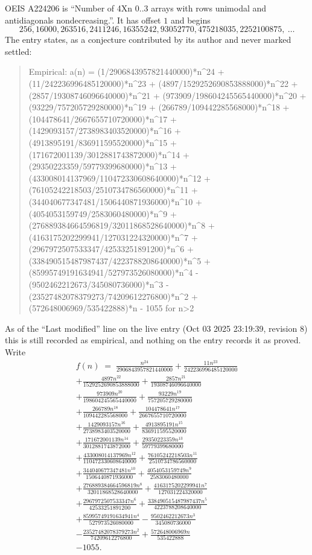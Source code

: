 \documentclass[11pt,a4paper]{article}
\theoremstyle{plain}
\theoremstyle{definition}
\begin{document}
OEIS A224206 is ``Number of 4Xn 0..3 arrays with rows unimodal and antidiagonals nondecreasing.''. It has offset $1$ and begins
\[
256, 16000, 263516, 2411246, 16355242, 93052770, 475218035, 2252100875,\ \dots
\]
The entry states, as a conjecture contributed by its author and never marked settled:
\begin{quote}\raggedright\small
Empirical: a(n) = (1/2906843957821440000)*n\^{}24 + (11/242236996485120000)*n\^{}23 + (4897/1529252690853888000)*n\^{}22 + (2857/19308746096640000)*n\^{}21 + (973909/198604245565440000)*n\^{}20 + (93229/757205729280000)*n\^{}19 + (266789/109442285568000)*n\^{}18 + (104478641/2667655710720000)*n\^{}17 + (1429093157/2738983403520000)*n\^{}16 + (4913895191/836911595520000)*n\^{}15 + (171672001139/3012881743872000)*n\^{}14 + (29350223359/59779399680000)*n\^{}13 + (433008014137969/110472330608640000)*n\^{}12 + (76105242218503/2510734786560000)*n\^{}11 + (344040677347481/1506440871936000)*n\^{}10 + (4054053159749/2583060480000)*n\^{}9 + (276889384664596819/32011868528640000)*n\^{}8 + (4163175202299941/127031224320000)*n\^{}7 + (2967972507533347/42533251891200)*n\^{}6 + (338490515487987437/4223788208640000)*n\^{}5 + (85995749191634941/527973526080000)*n\^{}4 - (9502462212673/345080736000)*n\^{}3 - (23527482078379273/74209612276800)*n\^{}2 + (572648006969/535422888)*n - 1055 for n>2
\end{quote}
As of the ``Last modified'' line on the live entry (Oct 03 2025 23:19:39, revision 8) this is still
recorded as empirical, and nothing on the entry records it as proved. Write
\begin{multline*}
f(n)\;=\;\frac{n^{24}}{2906843957821440000} + \frac{11 n^{23}}{242236996485120000} \\
+ \frac{4897 n^{22}}{1529252690853888000} + \frac{2857 n^{21}}{19308746096640000} \\
+ \frac{973909 n^{20}}{198604245565440000} + \frac{93229 n^{19}}{757205729280000} \\
+ \frac{266789 n^{18}}{109442285568000} + \frac{104478641 n^{17}}{2667655710720000} \\
+ \frac{1429093157 n^{16}}{2738983403520000} + \frac{4913895191 n^{15}}{836911595520000} \\
+ \frac{171672001139 n^{14}}{3012881743872000} + \frac{29350223359 n^{13}}{59779399680000} \\
+ \frac{433008014137969 n^{12}}{110472330608640000} + \frac{76105242218503 n^{11}}{2510734786560000} \\
+ \frac{344040677347481 n^{10}}{1506440871936000} + \frac{4054053159749 n^{9}}{2583060480000} \\
+ \frac{276889384664596819 n^{8}}{32011868528640000} + \frac{4163175202299941 n^{7}}{127031224320000} \\
+ \frac{2967972507533347 n^{6}}{42533251891200} + \frac{338490515487987437 n^{5}}{4223788208640000} \\
+ \frac{85995749191634941 n^{4}}{527973526080000} - \frac{9502462212673 n^{3}}{345080736000} \\
- \frac{23527482078379273 n^{2}}{74209612276800} + \frac{572648006969 n}{535422888} \\
- 1055.
\end{multline*}
\end{document}
